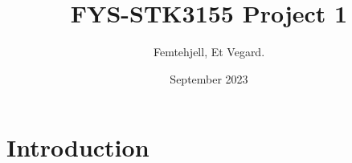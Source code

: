 \documentclass{article}
\title{FYS-STK3155 Project 1}
\author{Femtehjell, Et Vegard.}
\date{September 2023}
\begin{document}
\maketitle

\section{Introduction}
\end{document}
